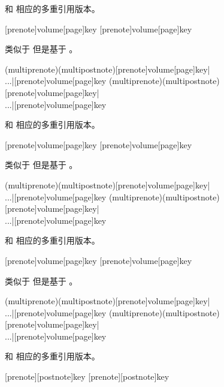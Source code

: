 \begin{ltxsyntax}
 和  相应的多重引用版本。

[prenote]{volume}[page]{key}
[prenote]{volume}[page]{key}

类似于  但是基于 。

(multiprenote)(multipostnote)[prenote]{volume}[page]{key}|\\...|[prenote]{volume}[page]{key}
(multiprenote)(multipostnote)[prenote]{volume}[page]{key}|\\...|[prenote]{volume}[page]{key}

 和  相应的多重引用版本。

[prenote]{volume}[page]{key}
[prenote]{volume}[page]{key}

类似于  但是基于 。

(multiprenote)(multipostnote)[prenote]{volume}[page]{key}|\\...|[prenote]{volume}[page]{key}
(multiprenote)(multipostnote)[prenote]{volume}[page]{key}|\\...|[prenote]{volume}[page]{key}

 和  相应的多重引用版本。

[prenote]{volume}[page]{key}
[prenote]{volume}[page]{key}

类似于  但是基于 。

(multiprenote)(multipostnote)[prenote]{volume}[page]{key}|\\...|[prenote]{volume}[page]{key}
(multiprenote)(multipostnote)[prenote]{volume}[page]{key}|\\...|[prenote]{volume}[page]{key}

 和  相应的多重引用版本。

[prenote][postnote]{key}
[prenote][postnote]{key}


\end{ltxsyntax}
